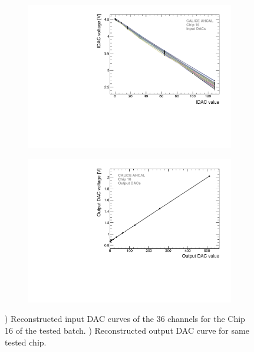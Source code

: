 \begin{figure}[htbp!]
  \centering
  \begin{subfigure}[t]{0.49\textwidth}
    \includegraphics[width=1.\linewidth]{chap4/fig_Commi/IDACs_Chip16.pdf}
    \caption{} \label{fig:IDAC}
  \end{subfigure}
  \hfill
  \begin{subfigure}[t]{0.49\textwidth}
    \includegraphics[width=1.\linewidth]{chap4/fig_Commi/OutDACs_Chip16.pdf}
    \caption{} \label{fig:OutDAC}
  \end{subfigure}
  \caption{) Reconstructed input DAC curves of the 36 channels for the Chip 16 of the tested batch. ) Reconstructed output DAC curve for same tested chip.}
\end{figure}

